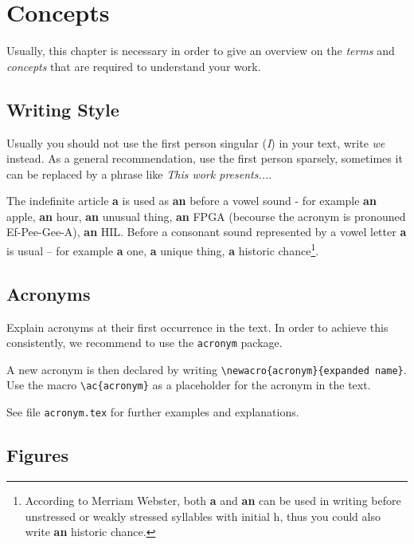 
\chapter{Concepts} \label{chapter:concepts}

Usually, this chapter is necessary in order to give an overview on
the \emph{terms} and \emph{concepts} that are required to understand
your work.

\section{Writing Style}

Usually you should not use the first person singular (\emph{I}) in
your text, write \emph{we} instead. As a general recommendation, use
the first person sparsely, sometimes it can be replaced by a phrase
like \emph{This work presents...}.

The indefinite article \textbf{a} is used as \textbf{an} before a
vowel sound - for example \textbf{an} apple, \textbf{an} hour,
\textbf{an} unusual thing, \textbf{an} FPGA (becourse the acronym is
pronouned Ef-Pee-Gee-A), \textbf{an} HIL. Before a consonant sound
represented by a vowel letter \textbf{a} is usual -- for example
\textbf{a} one, \textbf{a} unique thing, \textbf{a} historic
chance\footnote{According to Merriam Webster, both \textbf{a} and
\textbf{an} can be used in writing before unstressed or weakly
stressed syllables with initial h, thus you could also write
\textbf{an} historic chance.}.

\section{Acronyms}

Explain acronyms at their first occurrence in the text. In order to
achieve this consistently, we recommend to use the \texttt{acronym}
package.

A new acronym is then declared by writing
\verb+\newacro{acronym}{expanded name}+. Use the macro
\verb+\ac{acronym}+ as a placeholder for the acronym in the text.

See file \texttt{acronym.tex} for further examples and explanations.


\section{Figures}

